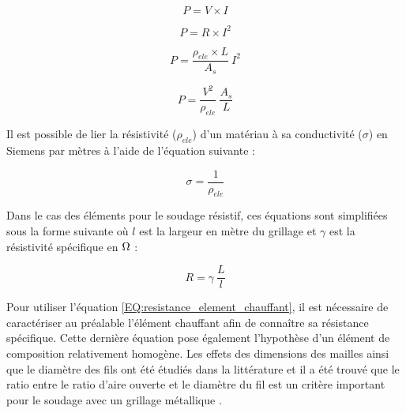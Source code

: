 \begin{equation}
P = V \times I
\end{equation}

\begin{equation}
P = R \times I^2
\end{equation}

\begin{equation}
P = \frac{\rho_{ele} \times L}{A_s} \ I^2
\end{equation}

\begin{equation}
P = \frac{V^2}{\rho_{ele}} \ \frac{A_s}{L}
\end{equation}

Il est possible de lier la résistivité ($\rho_{ele}$) d'un matériau à sa conductivité ($\sigma$) en Siemens par mètres à l'aide de l'équation suivante :

\begin{equation}
\sigma = \frac{1}{\rho_{ele}}
\end{equation}

Dans le cas des éléments pour le soudage résistif, ces équations sont simplifiées sous la forme suivante où $l$ est la largeur en mètre du grillage et $\gamma$ est la résistivité spécifique en $\ohm$ :

\begin{equation}
R = \gamma \ \frac{L}{l}
\label{EQ:resistance_element_chauffant}
\end{equation}

Pour utiliser l'équation \ref{EQ:resistance_element_chauffant}, il est nécessaire de caractériser au préalable l'élément chauffant afin de connaître sa résistance spécifique. 
Cette dernière équation pose également l'hypothèse d'un élément de composition relativement homogène. 
Les effets des dimensions des mailles ainsi que le diamètre des fils ont été étudiés dans la littérature et il a été trouvé que le ratio entre le ratio d'aire ouverte et le diamètre du fil est un critère important pour le soudage avec un grillage métallique \cite{Dube2012a}. 

